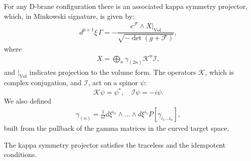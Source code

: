 For any D-brane configuration there is an associated kappa symmetry projector, which, in Minkowski signature, is given by\cite{Skenderis:2002vf}:
\begin{align}
d^{p+1} \xi \, \Gamma = - \dfrac{ e^{\mathcal{F}}\wedge X|_{\text{Vol}}}{\sqrt{-\det  (g+\mathcal{F})}},
\end{align}
where
\begin{align}
X = \bigoplus_n \gamma_{(2n)} \mathcal{K}^n \mathcal{I},
\end{align}
and $|_{\text{Vol}}$ indicates projection to the volume form.
The operators $\mathcal{K}$, which is complex conjugation, and $\mathcal{I}$, act on a spinor $\psi$:
\begin{equation}
 \mathcal{K} \psi = \psi^* , \quad \mathcal{I} \psi = -i \psi.
\end{equation}
We also defined
\begin{align}
\gamma_{(n)} = \frac{1}{n !}d\xi^{i_n}\wedge ... \wedge d\xi^{i_1} P[\gamma_{i_1...i_n}],
\end{align}
built from the pullback of the gamma matrices in the curved target space. 

The kappa symmetry projector satisfies the traceless and the idempotent conditions.

